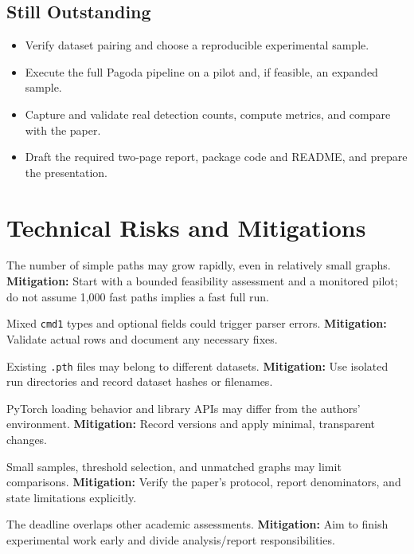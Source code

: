 \documentclass[11pt,letterpaper]{article}
\begin{document}
\subsection{Still Outstanding}
\begin{itemize}
\item Verify dataset pairing and choose a reproducible experimental sample.
\item Execute the full Pagoda pipeline on a pilot and, if feasible, an expanded sample.
\item Capture and validate real detection counts, compute metrics, and compare with the paper.
\item Draft the required two-page report, package code and README, and prepare the presentation.
\end{itemize}

\section{Technical Risks and Mitigations}
\begin{description}[style=nextline,leftmargin=0pt,itemsep=5pt]
\item[Path enumeration complexity.] The number of simple paths may grow rapidly, even in relatively small graphs. \textbf{Mitigation:} Start with a bounded feasibility assessment and a monitored pilot; do not assume 1,000 fast paths implies a fast full run.
\item[CSV and identifier compatibility.] Mixed \texttt{cmd1} types and optional fields could trigger parser errors. \textbf{Mitigation:} Validate actual rows and document any necessary fixes.
\item[Stale cached results.] Existing \texttt{.pth} files may belong to different datasets. \textbf{Mitigation:} Use isolated run directories and record dataset hashes or filenames.
\item[Software-version differences.] PyTorch loading behavior and library APIs may differ from the authors' environment. \textbf{Mitigation:} Record versions and apply minimal, transparent changes.
\item[Evaluation design.] Small samples, threshold selection, and unmatched graphs may limit comparisons. \textbf{Mitigation:} Verify the paper's protocol, report denominators, and state limitations explicitly.
\item[Time and competing coursework.] The deadline overlaps other academic assessments. \textbf{Mitigation:} Aim to finish experimental work early and divide analysis/report responsibilities.
\end{description}
\end{document}
